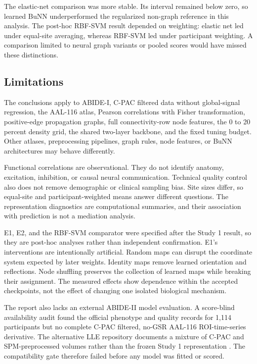 \documentclass[11pt,a4paper]{article}
\begin{document}
The elastic-net comparison was more stable. Its interval remained below zero,
so learned BuNN underperformed the regularized non-graph reference in this
analysis. The post-hoc RBF-SVM result depended on weighting: elastic net led
under equal-site averaging, whereas RBF-SVM led under participant weighting.
A comparison limited to neural graph variants or pooled scores would have
missed these distinctions.

\subsection{Limitations}

The conclusions apply to ABIDE-I, C-PAC filtered data without global-signal
regression, the AAL-116 atlas, Pearson correlations with Fisher transformation,
positive-edge propagation graphs, full connectivity-row node features, the 0
to 20 percent density grid, the shared two-layer backbone, and the fixed tuning
budget. Other atlases, preprocessing pipelines, graph rules, node features, or
BuNN architectures may behave differently.

Functional correlations are observational. They do not identify anatomy,
excitation, inhibition, or causal neural communication. Technical quality
control also does not remove demographic or clinical sampling bias. Site sizes
differ, so equal-site and participant-weighted means answer different
questions. The representation diagnostics are computational summaries, and
their association with prediction is not a mediation analysis.

E1, E2, and the RBF-SVM comparator were specified after the Study 1 result, so
they are post-hoc analyses rather than independent confirmation. E1's interventions are intentionally
artificial. Random maps can disrupt the coordinate system expected by later
weights. Identity maps remove learned orientation and reflections. Node
shuffling preserves the collection of learned maps while breaking their
assignment. The measured effects show dependence within the accepted
checkpoints, not the effect of changing one isolated biological mechanism.

The report also lacks an external ABIDE-II model evaluation. A score-blind
availability audit found the official phenotype and quality records for 1,114
participants but no complete C-PAC filtered, no-GSR AAL-116 ROI-time-series
derivative. The alternative LLE repository documents a mixture of C-PAC and
SPM-preprocessed volumes rather than the frozen Study 1 representation
\cite{abideii_release,abide_lle}. The compatibility gate therefore failed
before any model was fitted or scored.
\end{document}
